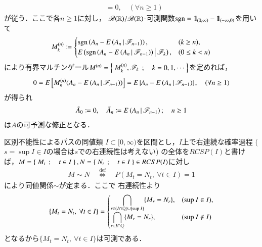 \begin{prf}
\begin{align}
			&= 0,
			\quad (\forall n \geq 1)
		\end{align}
		が従う．ここで各$n \geq 1$に対し，
		$\mathscr{B}(\mathbb{R})/\mathscr{B}(\mathbb{R})$-可測関数$\operatorname{sgn} = \mbox{1}\hspace{-0.25em}\mbox{l}_{(0,\infty)} - \mbox{1}\hspace{-0.25em}\mbox{l}_{(-\infty,0)}$を用いて
		\begin{align}
			M^{(n)}_k \coloneqq 
			\begin{cases}
				\operatorname{sgn}\left( A_n - E\left( A_n \, \middle|\, \mathscr{F}_{n-1} \right) \right), & (k \geq n), \\
				E\left( \operatorname{sgn}\left( A_n - E\left( A_n \, \middle|\, \mathscr{F}_{n-1} \right) \right) \, \middle|\, \mathscr{F}_k \right), & (0 \leq k < n)
			\end{cases}
		\end{align}
		により有界マルチンゲール$M^{(n)} = \left\{\ M^{(n)}_k,\mathscr{F}_k\ \, ; \quad k=0,1,\cdots\ \right\}$を定めれば，
		\begin{align}
			0 = E\left[ M^{(n)}_n(A_n - E\left( A_n \, \middle|\, \mathscr{F}_{n-1} \right)) \right] 
			= E\left| A_n - E\left( A_n \, \middle|\, \mathscr{F}_{n-1} \right) \right|,
			\quad (\forall n \geq 1)
		\end{align}
		が得られ
		\begin{align}
			\tilde{A}_0 \coloneqq 0,
			\quad \tilde{A}_n \coloneqq E\left( A_n \, \middle|\, \mathscr{F}_{n-1} \right); \quad n \geq 1
		\end{align}
		は$A$の可予測な修正となる．
		\QED
	\end{prf}
	
	\begin{itembox}[l]{区別不能性によるパスの同値類}
		$I \subset [0,\infty)$を区間とし，$I$上で右連続な確率過程
		($s=\sup{}{I} \in I$の場合は$s$での右連続性は考えない)
		の全体を$RCSP(I)$と書けば，$M = \left\{\ M_t\ \, ; \quad t \in I\ \right\},N = \left\{\ N_t\ \, ; \quad t \in I\ \right\} \in RCSP(I)$に対し
		\begin{align}
			M \sim N \quad \overset{\mathrm{def}}{\Longleftrightarrow} \quad 
			P(M_t = N_t,\ \forall t \in I) = 1
			\label{eq:equivalence_with_respect_to_path}
		\end{align}
		により同値関係$\sim$が定まる．ここで
		右連続性より
		\begin{align}
			\{M_t = N_t,\ \forall t \in I\} = 
			\begin{cases}
				\displaystyle \bigcap_{r \in (I \cap \mathbb{Q}) \cup \{\operatorname*{sup}_{} I\}}\{M_r = N_r\}, & (\operatorname*{sup}_{} I \in I), \\
				\displaystyle \bigcap_{r \in I \cap \mathbb{Q}}\{M_r = N_r\}, & (\operatorname*{sup}_{} I \notin I)
			\end{cases}
		\end{align}
		となるから$\{M_t = N_t,\ \forall t \in I\}$は可測である．
	\end{itembox}
	
